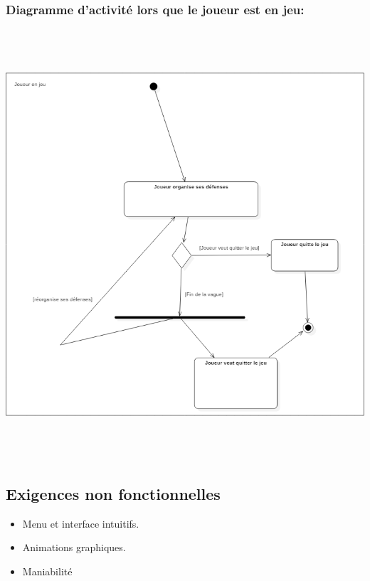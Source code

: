 \documentclass[10pt,a4paper]{article}
\begin{document}
\newpage
\subsubsection{Diagramme d'activité lors que le joueur est en jeu:}

\begin{center}
    \includegraphics[height=16cm,width=19cm]{joueur_en_jeu.png}
\end{center}

\newpage    
\subsection{Exigences non fonctionnelles}

\begin{itemize}
    \item Menu et interface intuitifs.
    \item Animations graphiques.
    \item Maniabilité
    
\end{itemize}
    
\end{document}
